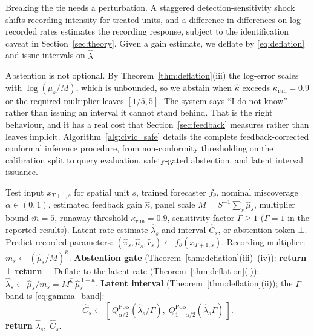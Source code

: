 \documentclass[journal,10pt,twocolumn]{IEEEtran}
\begin{document}
Breaking the tie needs a perturbation. A staggered detection-sensitivity shock
shifts recording intensity for treated units, and a difference-in-differences on
log recorded rates estimates the recording response, subject to the
identification caveat in Section~\ref{sec:theory}. Given a gain estimate, we
deflate by \eqref{eq:deflation} and issue intervals on $\hat\lambda$.

Abstention is not optional. By Theorem~\ref{thm:deflation}(iii) the log-error
scales with $\log(\mu_s/M)$, which is unbounded, so we abstain when $\hat\kappa$
exceeds $\kappa_{\mathrm{run}} = 0.9$ or the required multiplier leaves
$[1/5, 5]$. The system says ``I do not know'' rather than issuing an interval it
cannot stand behind. That is the right behaviour, and it has a real cost that
Section~\ref{sec:feedback} measures rather than leaves implicit.
Algorithm~\ref{alg:civic_safe} details the complete feedback-corrected
conformal inference procedure, from non-conformity thresholding on the
calibration split to query evaluation, safety-gated abstention, and latent interval
issuance.

\begin{algorithm}[!t]
\caption{Feedback-Corrected Latent Conformal Prediction (\textsf{CIVIC-SAFE})}
\label{alg:civic_safe}
\begin{algorithmic}[1]
\REQUIRE Test input $x_{T+1, s}$ for spatial unit $s$, trained forecaster
$f_\theta$, nominal miscoverage $\alpha \in (0,1)$, estimated feedback gain
$\hat{\kappa}$, panel scale $M = S^{-1}\sum_s \hat{\mu}_s$, multiplier bound
$\bar{m} = 5$, runaway threshold $\kappa_{\mathrm{run}} = 0.9$, sensitivity factor
$\Gamma \ge 1$ ($\Gamma = 1$ in the reported results).
\ENSURE Latent rate estimate $\hat{\lambda}_s$ and interval $\widehat{C}_s$, or
abstention token $\bot$.
\STATE Predict recorded parameters:
       $(\hat{\pi}_s, \hat{\mu}_s, \hat{r}_s) \leftarrow f_\theta(x_{T+1, s})$.
\STATE Recording multiplier: $m_s \leftarrow (\hat{\mu}_s / M)^{\hat{\kappa}}$.
\STATE \textbf{Abstention gate} (Theorem~\ref{thm:deflation}(iii)--(iv)):
  \STATE \textbf{return} $\bot$ 
  \STATE \textbf{return} $\bot$ 
\ENDIF
\STATE Deflate to the latent rate (Theorem~\ref{thm:deflation}(i)):
       $\hat{\lambda}_s \leftarrow \hat{\mu}_s / m_s
        = M^{\hat{\kappa}}\, \hat{\mu}_s^{\,1-\hat{\kappa}}$.
\STATE \textbf{Latent interval} (Theorem~\ref{thm:deflation}(ii)); the $\Gamma$
       band is \eqref{eq:gamma_band}:
       \[
       \widehat{C}_s \leftarrow \left[\,
         Q^{\mathrm{Pois}}_{\alpha/2}\!\left(\hat{\lambda}_s/\Gamma\right),\;
         Q^{\mathrm{Pois}}_{1-\alpha/2}\!\left(\hat{\lambda}_s\Gamma\right)
       \,\right].
       \]
\STATE \textbf{return} $\hat{\lambda}_s,\; \widehat{C}_s$.
\end{algorithmic}
\end{algorithm}
\end{document}
